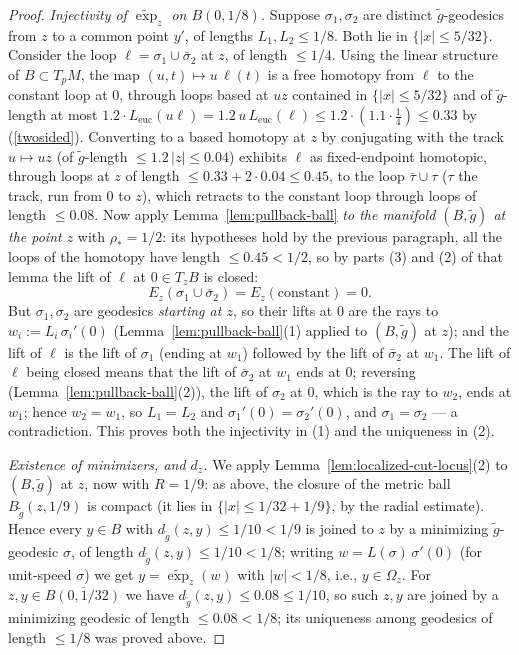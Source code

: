 \begin{proof}
\emph{Injectivity of $\widetilde\exp_z$ on $B(0,1/8)$.} Suppose
$\sigma_1,\sigma_2$ are distinct $\tilde g$-geodesics from $z$ to a
common point $y'$, of lengths $L_1,L_2\le1/8$. Both lie in
$\{|x|\le5/32\}$. Consider the loop $\ell=\sigma_1\cup\bar\sigma_2$
at $z$, of length $\le1/4$. Using the linear structure of $B\subset
T_pM$, the map $(u,t)\mapsto u\,\ell(t)$ is a free homotopy from
$\ell$ to the constant loop at $0$, through loops based at $uz$
contained in $\{|x|\le5/32\}$ and of $\tilde g$-length at most
$1.2\cdot L_{\mathrm{euc}}(u\ell)=1.2\,u\,L_{\mathrm{euc}}(\ell)
\le1.2\cdot\left(1.1\cdot\tfrac14\right)\le0.33$
by (\ref{twosided}). Converting to a based homotopy at $z$ by
conjugating with the track $u\mapsto uz$ (of $\tilde g$-length
$\le1.2\,|z|\le0.04$) exhibits $\ell$ as fixed-endpoint homotopic,
through loops at $z$ of length $\le0.33+2\cdot0.04\le0.45$, to the
loop $\bar\tau\cup\tau$ ($\tau$ the track, run from $0$ to $z$),
which retracts to the constant loop through loops of length
$\le0.08$. Now apply
Lemma~\ref{lem:pullback-ball} \emph{to the manifold $(B,\tilde g)$
at the point $z$} with $\rho_*=1/2$: its hypotheses hold by the
previous paragraph, all the loops of the homotopy have length
$\le0.45<1/2$, so by parts (3) and (2) of that lemma the lift of
$\ell$ at $0\in T_zB$ is closed:
$$E_z(\sigma_1\cup\bar\sigma_2)=E_z(\text{constant})=0.$$
But $\sigma_1,\sigma_2$ are geodesics \emph{starting at $z$}, so
their lifts at $0$ are the rays to $w_i:=L_i\,\sigma_i'(0)$
(Lemma~\ref{lem:pullback-ball}(1) applied to $(B,\tilde g)$ at
$z$); and the lift of $\ell$ is the lift of $\sigma_1$ (ending at
$w_1$) followed by the lift of $\bar\sigma_2$ at $w_1$. The lift of
$\ell$ being closed means that the lift of $\bar\sigma_2$ at $w_1$
ends at $0$; reversing (Lemma~\ref{lem:pullback-ball}(2)), the lift
of $\sigma_2$ at $0$, which is the ray to $w_2$, ends at $w_1$;
hence $w_2=w_1$, so $L_1=L_2$ and
$\sigma_1'(0)=\sigma_2'(0)$, and $\sigma_1=\sigma_2$ ---
a contradiction. This proves both the injectivity in (1) and the
uniqueness in (2).

\emph{Existence of minimizers, and $d_z$.} We apply
Lemma~\ref{lem:localized-cut-locus}(2) to $(B,\tilde g)$ at $z$,
now with $R=1/9$: as above, the closure of the metric ball
$B_{\tilde g}(z,1/9)$ is compact (it lies in
$\{|x|\le1/32+1/9\}$, by the radial estimate). Hence every $y\in
B$ with $d_{\tilde g}(z,y)\le1/10<1/9$ is joined to $z$ by a
minimizing $\tilde g$-geodesic $\sigma$, of length $d_{\tilde
g}(z,y)\le1/10<1/8$; writing $w=L(\sigma)\,\sigma'(0)$ (for
unit-speed $\sigma$) we get $y=\widetilde\exp_z(w)$ with
$|w|<1/8$, i.e., $y\in\Omega_z$. For
$z,y\in\overline{B(0,1/32)}$ we have $d_{\tilde
g}(z,y)\le0.08\le1/10$, so such $z,y$ are joined by a minimizing
geodesic of length $\le0.08<1/8$; its uniqueness among geodesics
of length $\le1/8$ was proved above.


\end{proof}
